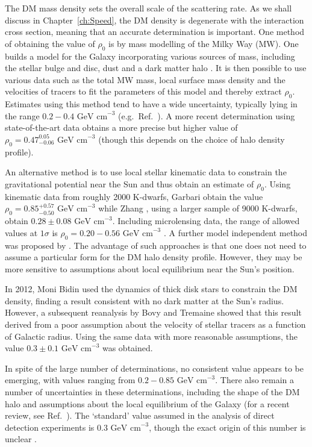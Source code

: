 The DM mass density sets the overall scale of the scattering rate. As we shall discuss in Chapter~\ref{ch:Speed}, the DM density is degenerate with the interaction cross section, meaning that an accurate determination is important. One method of obtaining the value of $\rho_0$ is by mass modelling of the Milky Way (MW). One builds a model for the Galaxy incorporating various sources of mass, including the stellar bulge and disc, dust and a dark matter halo \cite{Catena:2010}. It is then possible to use various data such as the total MW mass, local surface mass density and the velocities of tracers to fit the parameters of this model and thereby extract $\rho_0$. Estimates using this method tend to have a wide uncertainty, typically lying in the range \(0.2 - 0.4 \textrm{ GeV cm}^{-3}\) (e.g.\ Ref.\ \cite{Catena:2010,Weber:2010}). A more recent determination using state-of-the-art data obtains a more precise but higher value of $\rho_0 = 0.47_{-0.06}^{0.05} \textrm{ GeV cm}^{-3}$ \cite{Nesti:2013} (though this depends on the choice of halo density profile).

An alternative method is to use local stellar kinematic data to constrain the gravitational potential near the Sun and thus obtain an estimate of $\rho_0$. Using kinematic data from roughly 2000 K-dwarfs, Garbari \etal \cite{Garbari:2012} obtain the value \(\rho_0 = 0.85_{-0.50}^{+0.57} \textrm{ GeV cm}^{-3}\) while Zhang \etal, using a larger sample of 9000 K-dwarfs, obtain $0.28\pm0.08 \textrm{ GeV cm}^{-3}$. Including microlensing data, the range of allowed values at $1\sigma$ is $\rho_0 = 0.20-0.56 \textrm{ GeV cm}^{-3}$ \cite{Iocco:2011}. A further model independent method was proposed by \cite{Salucci:2010}. The advantage of such approaches is that one does not need to assume a particular form for the DM halo density profile. However, they may be more sensitive to assumptions about local equilibrium near the Sun's position.

In 2012, Moni Bidin \etal \cite{Moni-Bidin:2012} used the dynamics of thick disk stars to constrain the DM density, finding a result consistent with no dark matter at the Sun's radius. However, a subsequent reanalysis by Bovy and Tremaine \cite{Bovy:2012} showed that this result derived from a poor assumption about the velocity of stellar tracers as a function of Galactic radius. Using the same data with more reasonable assumptions, the value $0.3 \pm 0.1 \textrm{ GeV cm}^{-3}$ was obtained.

In spite of the large number of determinations, no consistent value appears to be emerging, with values ranging from $0.2 - 0.85 \textrm{ GeV cm}^{-3}$. There also remain a number of uncertainties in these determinations, including the shape of the DM halo and assumptions about the local equilibrium of the Galaxy (for a recent review, see Ref.~\cite{Read:2014}). The `standard' value assumed in the analysis of direct detection experiments is $0.3 \textrm{ GeV cm}^{-3}$, though the exact origin of this number is unclear \cite{Green:2012}.

